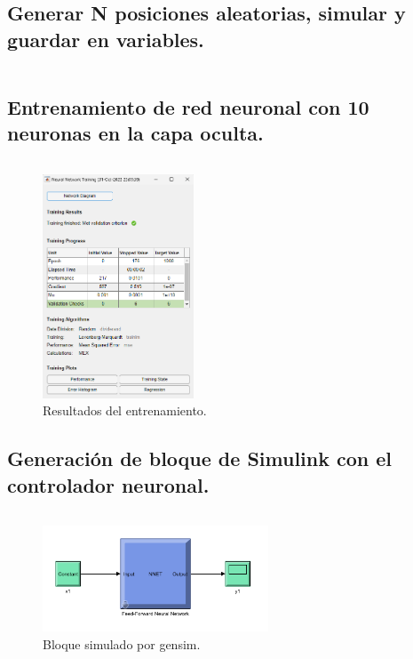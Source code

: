 \documentclass[a4paper, 12pt]{article}
\begin{document}
	\subsection{Generar N posiciones aleatorias, simular y guardar en variables.}
		\inputminted[fontsize=\scriptsize, linenos, breaklines=true, xleftmargin=0.75cm, frame=lines]{matlab}{code/parte2/EjerE.m}
		
	\subsection{Entrenamiento de red neuronal con 10 neuronas en la capa oculta.}
		\inputminted[fontsize=\scriptsize, linenos, breaklines=true, xleftmargin=0.75cm, frame=lines]{matlab}{code/parte2/EjerF.m}
		
		\begin{figure}[htp!]
			\centering
			\includegraphics[width=0.4\textwidth]{figures/parte2/ejerF.png}
			\caption{Resultados del entrenamiento.}
		\end{figure}
	\newpage
	\subsection{Generación de bloque de Simulink con el controlador neuronal.}
		\inputminted[fontsize=\scriptsize, linenos, breaklines=true, xleftmargin=0.75cm, frame=lines]{matlab}{code/parte2/EjerG.m}
		
		\begin{figure}[htp!]
			\centering
			\includegraphics[width=0.6\textwidth]{figures/parte2/ejerG.png}
			\caption{Bloque simulado por gensim.}
		\end{figure}
	
\end{document}
